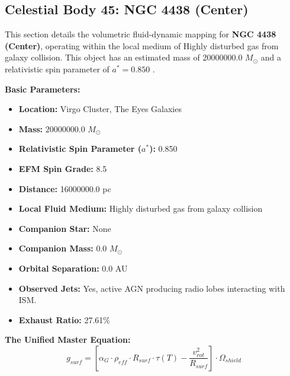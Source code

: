\documentclass[11pt, a4paper]{article}
\begin{document}
\clearpage
\subsection{Celestial Body 45: NGC 4438 (Center)}
This section details the volumetric fluid-dynamic mapping for \textbf{NGC 4438 (Center)}, operating within the local medium of Highly disturbed gas from galaxy collision. This object has an estimated mass of 20000000.0 $M_{\odot}$ and a relativistic spin parameter of $a^* = 0.850$ \cite{machacek2004, ned}.

\vspace{0.5em}
\noindent \textbf{Basic Parameters:}
\begin{itemize}
  \item \textbf{Location:} Virgo Cluster, The Eyes Galaxies
  \item \textbf{Mass:} 20000000.0 $M_{\odot}$
  \item \textbf{Relativistic Spin Parameter ($a^*$):} 0.850
  \item \textbf{EFM Spin Grade:} 8.5
  \item \textbf{Distance:} 16000000.0 pc
  \item \textbf{Local Fluid Medium:} Highly disturbed gas from galaxy collision
  \item \textbf{Companion Star:} None
  \item \textbf{Companion Mass:} 0.0 $M_{\odot}$
  \item \textbf{Orbital Separation:} 0.0 AU
  \item \textbf{Observed Jets:} Yes, active AGN producing radio lobes interacting with ISM.
  \item \textbf{Exhaust Ratio:} 27.61\%
\end{itemize}

\vspace{0.5em}
\noindent \textbf{The Unified Master Equation:}
$$ g_{surf} = \left[ \alpha_G \cdot \rho_{eff} \cdot R_{surf} \cdot \tau(T) - \frac{v_{rot}^2}{R_{surf}} \right] \cdot \Omega_{shield} $$
\end{document}
